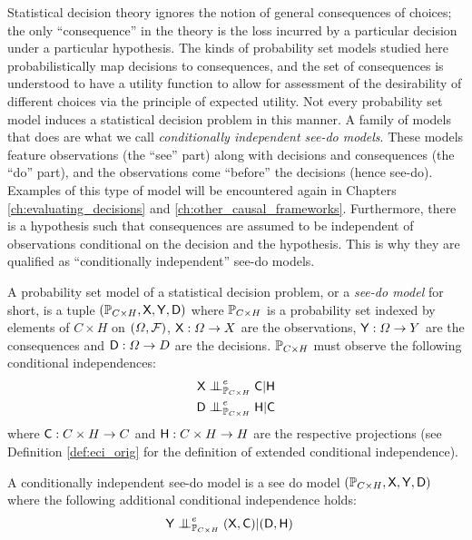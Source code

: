 Statistical decision theory ignores the notion of general consequences of choices; the only ``consequence'' in the theory is the loss incurred by a particular decision under a particular hypothesis. The kinds of probability set models studied here probabilistically map decisions to consequences, and the set of consequences is understood to have a utility function to allow for assessment of the desirability of different choices via the principle of expected utility. Not every probability set model induces a statistical decision problem in this manner. A family of models that does are what we call \emph{conditionally independent see-do models}. These models feature observations (the ``see'' part) along with decisions and consequences (the ``do'' part), and the observations come ``before'' the decisions (hence see-do). Examples of this type of model will be encountered again in Chapters \ref{ch:evaluating_decisions} and \ref{ch:other_causal_frameworks}. Furthermore, there is a hypothesis such that consequences are assumed to be independent of observations conditional on the decision and the hypothesis. This is why they are qualified as ``conditionally independent'' see-do models.
\begin{definition}\label{def:see_do_model}
A probability set model of a statistical decision problem, or a \emph{see-do model} for short, is a tuple $(\mathbb{P}_{C\times H}, \mathsf{X},\mathsf{Y},\mathsf{D})$ where $\mathbb{P}_{C\times H}$ is a probability set indexed by elements of $C\times H$ on $(\Omega,\mathcal{F})$, $\mathsf{X}:\Omega\to X$ are the observations, $\mathsf{Y}:\Omega\to Y$ are the consequences and $\mathsf{D}:\Omega\to D$ are the decisions. $\mathbb{P}_{C\times H}$ must observe the following conditional independences:
\begin{align}
    \RV{X}&\CI^e_{\prob{P}_{C\times H}} \RV{C}|\RV{H}\\
    \RV{D}&\CI^e_{\prob{P}_{C\times H}} \RV{H}|\RV{C}
\end{align}
where $\mathsf{C}:C\times H\to C$ and $\mathsf{H}:C\times H\to H$ are the respective projections (see Definition \ref{def:eci_orig} for the definition of extended conditional independence).
\end{definition}
\begin{definition}\label{def:ci_see_do_model}
A conditionally independent see-do model is a see do model $(\mathbb{P}_{C\times H}, \mathsf{X},\mathsf{Y},\mathsf{D})$ where the following additional conditional independence holds:
\begin{align}
    \RV{Y}&\CI^e_{\prob{P}_{C\times H}} (\RV{X,C})|(\RV{D},\RV{H})
\end{align}
\end{definition}

